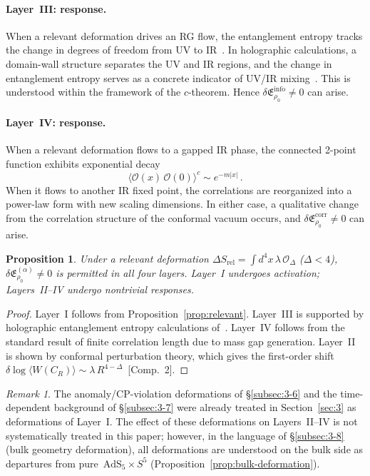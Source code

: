 \documentclass[
  aps,
  prd,
  preprint,
  groupedaddress,
  nofootinbib,
  longbibliography
]{revtex4-2}
\newtheorem{proposition}[definition]{Proposition}
\theoremstyle{remark}
\newtheorem{remark}[definition]{Remark}
\newcommand{\AdS}{\mathrm{AdS}}
\begin{document}
\paragraph{Layer~III: response.}
When a relevant deformation drives an RG flow, the entanglement
entropy tracks the change in degrees of freedom from UV to
IR~\cite{ref43}.
In holographic calculations, a domain-wall structure separates
the UV and IR regions, and the change in entanglement entropy
serves as a concrete indicator of UV/IR
mixing~\cite{ref43}.
This is understood within the framework of the $c$-theorem.
Hence
$\delta\mathfrak{E}_{\rho_0}^{\mathrm{info}}\neq 0$
can arise.

\paragraph{Layer~IV: response.}
When a relevant deformation flows to a gapped IR phase, the
connected 2-point function exhibits exponential decay
\begin{equation}\label{eq:gapped-corr}
  \langle\mathcal{O}(x)\,\mathcal{O}(0)\rangle^c
  \sim e^{-m|x|}\,.
\end{equation}
When it flows to another IR fixed point, the correlations are
reorganized into a power-law form with new scaling dimensions.
In either case, a qualitative change from the correlation
structure of the conformal vacuum occurs, and
$\delta\mathfrak{E}_{\rho_0}^{\mathrm{corr}}\neq 0$
can arise.

\begin{proposition}\label{prop:relevant-all-layers}
Under a relevant deformation
$\Delta S_{\mathrm{rel}}
=\int d^4x\,\lambda\,\mathcal{O}_\Delta$ ($\Delta<4$),
$\delta\mathfrak{E}_{\rho_0}^{(\alpha)}\neq 0$
is permitted in all four layers.
Layer~I undergoes activation; Layers~II--IV undergo nontrivial
responses.
\end{proposition}

\begin{proof}
Layer~I follows from
Proposition~\ref{prop:relevant}.
Layer~III is supported by holographic entanglement entropy
calculations of~\cite{ref43}.
Layer~IV follows from the standard result of finite correlation
length due to mass gap generation.
Layer~II is shown by conformal perturbation theory, which gives
the first-order shift
$\delta\log\langle W(C_R)\rangle
\sim\lambda\,R^{4-\Delta}$~[Comp.~2].
\end{proof}

\begin{remark}\label{rem:other-deformations}
The anomaly/CP-violation deformations of
\S\ref{subsec:3-6} and the time-dependent background of
\S\ref{subsec:3-7} were already treated in Section~\ref{sec:3}
as deformations of Layer~I\@.
The effect of these deformations on Layers~II--IV is not
systematically treated in this paper; however, in the language
of \S\ref{subsec:3-8} (bulk geometry deformation), all
deformations are understood on the bulk side as departures from
pure~$\AdS_5\times S^5$
(Proposition~\ref{prop:bulk-deformation}).
\end{remark}
\end{document}

